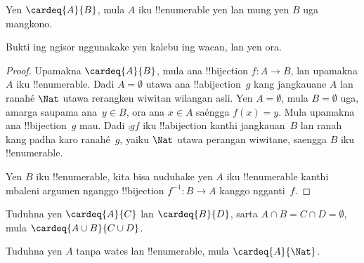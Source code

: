 \documentclass[../../../include/open-logic-section]{subfiles}
\begin{document}
\begin{prop}
Yen $\cardeq{A}{B}$, mula $A$ iku !!{enumerable}
yen lan mung yen $B$ uga mangkono.
\end{prop}

\begin{editorial}
Bukti ing ngisor nggunakake  yen
 kalebu ing wacan, lan 
yen ora.
\end{editorial}

\begin{proof}
Upamakna $\cardeq{A}{B}$, mula ana !!{bijection} $f \colon A
\to B$, lan upamakna $A$ iku !!{enumerable}.
{
  Dadi $A  = \emptyset$ utawa ana !!a{bijection}~$g$ kang
  jangkauane $A$ lan ranahé $\Nat$ utawa rerangken wiwitan
  wilangan asli. Yen $A = \emptyset$, mula $B =
  \emptyset$ uga, amarga saupama ana~$y \in B$, ora ana $x \in A$
  saéngga $f(x) = y$. Mula upamakna ana
  !!{bijection}~$g$ mau. Dadi $\comp{g}{f}$ iku !!a{bijection} kanthi
  jangkauan~$B$ lan ranah kang padha karo ranahé~$g$, yaiku $\Nat$ utawa
  perangan wiwitane, saengga $B$ iku !!{enumerable}.}

Yen $B$ iku !!{enumerable}, kita bisa nuduhake yen $A$ iku !!{enumerable}
kanthi mbaleni argumen nganggo !!{bijection} $f^{-1}\colon B \to A$
kanggo ngganti~$f$.
\end{proof}

\begin{prob}
Tuduhna yen $\cardeq{A}{C}$ lan $\cardeq{B}{D}$, sarta $A \cap B =
C \cap D = \emptyset$, mula $\cardeq{A \cup B}{C \cup D}$.
\end{prob}

\begin{prob}
Tuduhna yen $A$ tanpa wates lan !!{enumerable}, mula
$\cardeq{A}{\Nat}$.
\end{prob}
\end{document}
